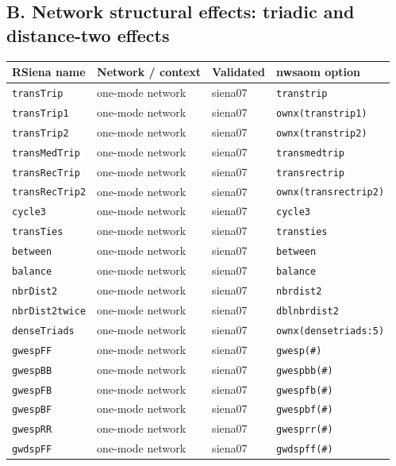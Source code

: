 \subsection*{B. Network structural effects: triadic and distance-two effects}
\footnotesize
\begin{longtable}{@{}p{2.6cm}p{3.2cm}p{2.9cm}p{5.4cm}@{}}
\toprule
RSiena name & Network / context & Validated & nwsaom option\\
\midrule
\endhead
\texttt{transTrip} & one-mode network & siena07 & \texttt{transtrip}\\
\texttt{transTrip1} & one-mode network & siena07 & \texttt{ownx(transtrip1)}\\
\texttt{transTrip2} & one-mode network & siena07 & \texttt{ownx(transtrip2)}\\
\texttt{transMedTrip} & one-mode network & siena07 & \texttt{transmedtrip}\\
\texttt{transRecTrip} & one-mode network & siena07 & \texttt{transrectrip}\\
\texttt{transRecTrip2} & one-mode network & siena07 & \texttt{ownx(transrectrip2)}\\
\texttt{cycle3} & one-mode network & siena07 & \texttt{cycle3}\\
\texttt{transTies} & one-mode network & siena07 & \texttt{transties}\\
\texttt{between} & one-mode network & siena07 & \texttt{between}\\
\texttt{balance} & one-mode network & siena07 & \texttt{balance}\\
\texttt{nbrDist2} & one-mode network & siena07 & \texttt{nbrdist2}\\
\texttt{nbrDist2twice} & one-mode network & siena07 & \texttt{dblnbrdist2}\\
\texttt{denseTriads} & one-mode network & siena07 & \texttt{ownx(densetriads:5)}\\
\texttt{gwespFF} & one-mode network & siena07 & \texttt{gwesp(\#)}\\
\texttt{gwespBB} & one-mode network & siena07 & \texttt{gwespbb(\#)}\\
\texttt{gwespFB} & one-mode network & siena07 & \texttt{gwespfb(\#)}\\
\texttt{gwespBF} & one-mode network & siena07 & \texttt{gwespbf(\#)}\\
\texttt{gwespRR} & one-mode network & siena07 & \texttt{gwesprr(\#)}\\
\texttt{gwdspFF} & one-mode network & siena07 & \texttt{gwdspff(\#)}\\

\end{longtable}
